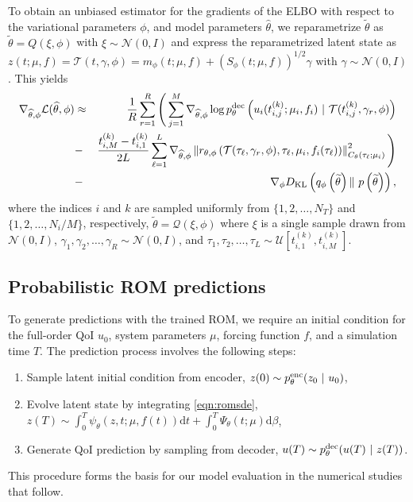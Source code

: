 \documentclass{article}
\begin{document}
	To obtain an unbiased estimator for the gradients of the ELBO with respect to the variational parameters $\phi$, and model parameters $\widehat{\theta}$, we reparametrize $\widetilde{\theta}$ as $\widetilde{\theta}=Q(\xi, \phi)$ with $\xi \sim \mathcal{N}(0, I)$ and express the reparametrized latent state as $z(t; \mu,f) = \mathcal{T}(t,\gamma,\phi)= m_\phi(t; \mu, f) + (S_\phi(t; \mu, f))^{1/2}\gamma$ with $\gamma \sim \mathcal{N}(0, I)$.  This  yields
	\begin{eqnarray} \label{eqn:partialprior_elbo_grad}
		\nabla_{\widehat{\theta},\phi} \mathcal{L}(\widehat{\theta},\phi) & \approx & 
		\frac{1}{R}\sum_{r=1}^{R}
		\Bigg( \sum_{j=1}^{M}
		\nabla_{\widehat{\theta},\phi}\log p_{\theta}^{\rm dec} \left ( u_{i}(t_{i,j}^{(k)};  \mu_i, f_i)\ |\ \mathcal{T}(t_{i,j}^{(k)},\gamma_r,\phi) \right ) \nonumber \\
		& - & \frac{t_{i,M}^{(k)}-t_{i,1}^{(k)}}{2L} 
		\sum_{\ell=1}^{L}
		\nabla_{\widehat{\theta},\phi}\left\| r_{\theta, \phi} \left(\mathcal{T}(\tau_\ell,\gamma_{r},\phi), \tau_\ell, \mu_i, f_i(\tau_{\ell})\right) \right\|_{C_{\theta}(\tau_{\ell};\mu_i)}^2 \Bigg) \nonumber \\
		& - & \nabla_{\phi} D_{\textrm{KL}}\left(q_\phi\left(\widetilde{\theta} \right) \|\ p\left(\widetilde{\theta} \right)\right),
	\end{eqnarray}
	where the indices $i$ and $k$ are sampled uniformly from $\{1,2, \ldots, N_T\}$ and $\{1,2, \ldots, N_i/M\}$, respectively, $\widetilde{\theta} = \mathcal{Q}(\xi, \phi)$ where $\xi$ is a single sample drawn from $\mathcal{N}(0, I)$, $\gamma_1, \gamma_2, \ldots, \gamma_R \sim \mathcal{N}(0, I)$, and $\tau_1, \tau_2, \ldots, \tau_L \sim \mathcal{U}[t_{i,1}^{(k)}, t_{i,M}^{(k)}]$.
	
	\subsection{Probabilistic ROM predictions}
	
	To generate predictions with the trained ROM, we require an initial condition for the full-order QoI $u_0$, system parameters $\mu$, forcing function $f$, and a simulation time $T$. The prediction process involves the following steps:
	\begin{enumerate}
		\item Sample latent initial condition from encoder, $z(0) \sim p_{\theta}^{\rm enc}(z_0\ |\ u_0)$,
		\item Evolve latent state by integrating \eqref{eqn:romsde}, $z(T) \sim \int_0^T {\psi}_{{\theta}}(z, t; \mu, f(t)) \text{d}t + \int_0^T {\Psi}_{{\theta}}(t; \mu) \text{d}{\beta}$,
		\item Generate QoI prediction by sampling from decoder, $u(T) \sim p_{\theta}^{\rm dec}(u(T)\ |\ z(T))$.
	\end{enumerate}
	This procedure forms the basis for our model evaluation in the numerical studies that follow.
	
\end{document}
